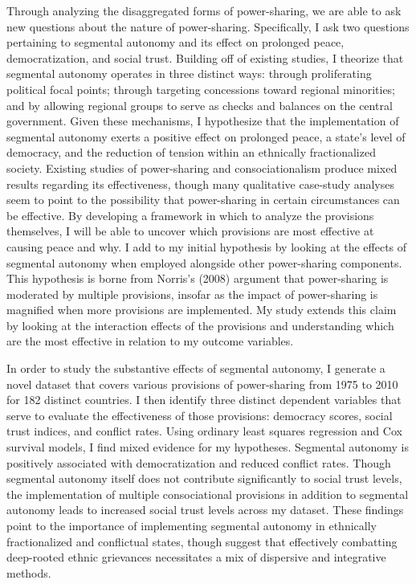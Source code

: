 \documentclass[12pt]{article}
\begin{document}
Through analyzing the disaggregated forms of power-sharing, we are able to ask new questions about the nature of power-sharing. Specifically, I ask two questions pertaining to segmental autonomy and its effect on prolonged peace, democratization, and social trust. Building off of existing studies, I theorize that segmental autonomy operates in three distinct ways: through proliferating political focal points; through targeting concessions toward regional minorities; and by allowing regional groups to serve as checks and balances on the central government. Given these mechanisms, I hypothesize that the implementation of segmental autonomy exerts a positive effect on prolonged peace, a state’s level of democracy, and the reduction of tension within an ethnically fractionalized society. Existing studies of power-sharing and consociationalism produce mixed results regarding its effectiveness, though many qualitative case-study analyses seem to point to the possibility that power-sharing in certain circumstances can be effective. By developing a framework in which to analyze the provisions themselves, I will be able to uncover which provisions are most effective at causing peace and why. I add to my initial hypothesis by looking at the effects of segmental autonomy when employed alongside other power-sharing components. This hypothesis is borne from Norris’s (2008) argument that power-sharing is moderated by multiple provisions, insofar as the impact of power-sharing is magnified when more provisions are implemented. My study extends this claim by looking at the interaction effects of the provisions and understanding which are the most effective in relation to my outcome variables.

In order to study the substantive effects of segmental autonomy, I generate a novel dataset that covers various provisions of power-sharing from 1975 to 2010 for 182 distinct countries. I then identify three distinct dependent variables that serve to evaluate the effectiveness of those provisions: democracy scores, social trust indices, and conflict rates. Using ordinary least squares regression and Cox survival models, I find mixed evidence for my hypotheses. Segmental autonomy is positively associated with democratization and reduced conflict rates. Though segmental autonomy itself does not contribute significantly to social trust levels, the implementation of multiple consociational provisions in addition to segmental autonomy leads to increased social trust levels across my dataset. These findings point to the importance of implementing segmental autonomy in ethnically fractionalized and conflictual states, though suggest that effectively combatting deep-rooted ethnic grievances necessitates a mix of dispersive and integrative methods.
 
\end{document}
